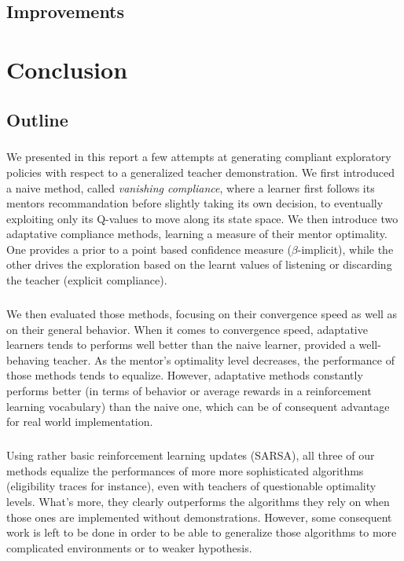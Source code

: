 \documentclass[a4paper]{report}
\begin{document}
{	\section{Improvements}
	{
	}
	\chapter*{Conclusion}
	{
		\section{Outline}
		{
			\paragraph{} We presented in this report a few attempts at generating compliant exploratory policies with respect to a generalized teacher demonstration. We first introduced a naive method, called \emph{vanishing compliance}, where a learner first follows its mentors recommandation before slightly taking its own decision, to eventually exploiting only its Q-values to move along its state space. We then introduce two adaptative compliance methods, learning a measure of their mentor optimality. One provides a prior to a point based confidence measure ($\beta$-implicit), while the other drives the exploration based on the learnt values of listening or discarding the teacher (explicit compliance).
			
			\paragraph{} We then evaluated those methods, focusing on their convergence speed as well as on their general behavior. When it comes to convergence speed, adaptative learners tends to performs well better than the naive learner, provided a well-behaving teacher. As the mentor's optimality level decreases, the performance of those methods tends to equalize. 
			\newline However, adaptative methods constantly performs better (in terms of behavior or average rewards in a reinforcement learning vocabulary) than the naive one, which can be of consequent advantage for real world implementation. 
			
			\paragraph{} Using rather basic reinforcement learning updates (SARSA), all three of our methods equalize the performances of more more sophisticated algorithms (eligibility traces for instance), even with teachers of questionable optimality levels. What's more, they clearly outperforms the algorithms they rely on when those ones are implemented without demonstrations. However, some consequent work is left to be done in order to be able to generalize those algorithms to more complicated environments or to weaker hypothesis. 
		}
}}
\end{document}
